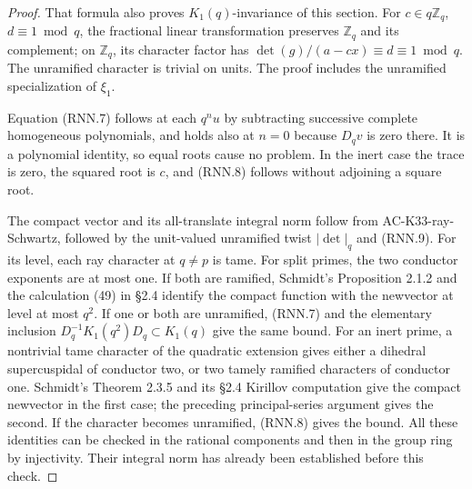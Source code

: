 \begin{proof}
That formula also proves \(K_1(q)\)-invariance of this section.
For \(c\in q\mathbb Z_q\), \(d\equiv1\bmod q\), the fractional
linear transformation preserves \(\mathbb Z_q\) and its
complement; on \(\mathbb Z_q\), its character factor has
\(\det(g)/(a-cx)\equiv d\equiv1\bmod q\).
The unramified character is trivial on units.
The proof includes the unramified specialization of \(\xi_1\).

Equation (RNN.7) follows at each \(q^n u\) by subtracting successive
complete homogeneous polynomials, and holds also at \(n=0\)
because \(D_qv\) is zero there.  It is a polynomial identity,
so equal roots cause no problem.  In the inert case the trace
is zero, the squared root is \(c\), and (RNN.8) follows without
adjoining a square root.

The compact vector and its all-translate integral norm follow
from AC-K33-ray-Schwartz, followed by the unit-valued unramified
twist \(|\det|_q\) and (RNN.9).
For its level, each ray character at \(q\ne p\) is tame.
For split primes, the two conductor exponents are at most one.
If both are ramified, Schmidt's Proposition 2.1.2 and the
calculation (49) in \S2.4 identify the compact function with
the newvector at level at most \(q^2\).
If one or both are unramified, (RNN.7) and the elementary inclusion
\(D_q^{-1} K_1(q^2)D_q\subset K_1(q)\) give the same bound.
For an inert prime, a nontrivial tame character of the quadratic
extension gives either a dihedral supercuspidal of conductor two,
or two tamely ramified characters of conductor one.  Schmidt's
Theorem 2.3.5 and its \S2.4 Kirillov computation give the compact
newvector in the first case; the preceding principal-series
argument gives the second.  If the character becomes unramified,
(RNN.8) gives the bound.
All these identities can be checked in the rational components
and then in the group ring by injectivity.  Their integral norm
has already been established before this check.
\end{proof}

